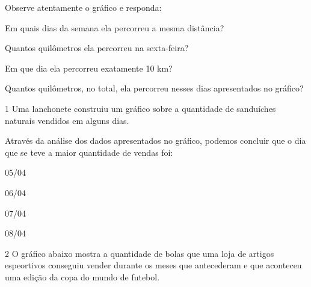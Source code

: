 Observe atentamente o gráfico e responda:

\begin{escolha}
\item
  Em quais dias da semana ela percorreu a mesma distância?


\item
  Quantos quilômetros ela percorreu na sexta-feira?


\item
  Em que dia ela percorreu exatamente 10 km?


\item
  Quantos quilômetros, no total, ela percorreu nesses dias apresentados
  no gráfico?

\end{escolha}



\num{1} Uma lanchonete construiu um gráfico sobre a quantidade de
sanduíches naturais vendidos em alguns dias.


Através da análise dos dados apresentados no gráfico, podemos concluir
que o dia que se teve a maior quantidade de vendas foi:

\begin{escolha}
\item
  05/04
\item
  06/04
\item
  07/04
\item
  08/04
\end{escolha}


\num{2} O gráfico abaixo mostra a quantidade de bolas que uma loja de
artigos espeortivos conseguiu vender durante os meses que antecederam e
que aconteceu uma edição da copa do mundo de futebol.


